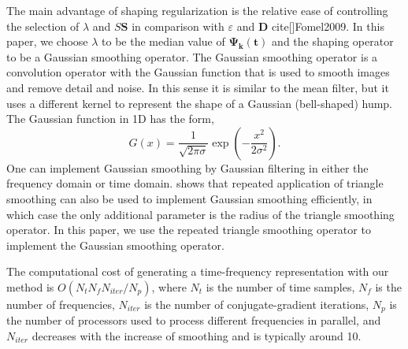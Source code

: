 The main advantage of shaping regularization is the relative ease
of controlling the selection of $\lambda$ and $S\mathbf{S}$ in comparison with $\varepsilon$ and $\mathbf{D}$
cite[]{Fomel2009}. In this paper, we choose $\lambda$ to be the median value of
$\mathbf{\Psi_{k}(t)}$ and the shaping operator to be a Gaussian smoothing operator.
The Gaussian smoothing operator is a convolution operator with
the Gaussian function that is used to smooth images and remove
detail and noise. In this sense it is similar to the mean filter, but
it uses a different kernel to represent the shape of a Gaussian
(bell-shaped) hump. The Gaussian function in 1D has the form,
      \begin{equation}
          G(x)=\frac{1}{\sqrt{2 \pi \sigma}} \exp \left( -\frac{x^{2}}{2\sigma^{2}}\right).
        \label{eq:eqa5}
      \end{equation}
One can implement Gaussian smoothing by Gaussian filtering in
either the frequency domain or time domain. \cite{Fomel2007b} shows
that repeated application of triangle smoothing can also be used to
implement Gaussian smoothing efficiently, in which case the only
additional parameter is the radius of the triangle smoothing
operator. In this paper, we use the repeated triangle smoothing operator
to implement the Gaussian smoothing operator.

The computational cost of generating a time-frequency representation
with our method is $O\left(N_{t}N_{f}N_{iter}/N_{p}\right)$, where $N_{t}$ is the number
of time samples, $N_{f}$ is the number of frequencies, $N_{iter}$ is the number
of conjugate-gradient iterations, $N_{p}$ is the number of processors
used to process different frequencies in parallel, and $N_{iter}$ decreases
with the increase of smoothing and is typically around 10.





